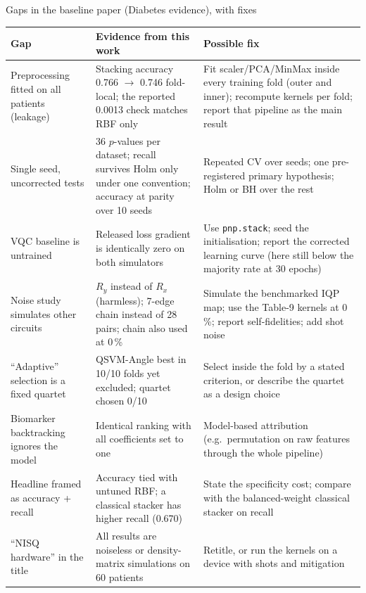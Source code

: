 \documentclass[aspectratio=169,10pt,t,xcolor={table}]{beamer}
\newcommand{\code}[1]{\texttt{\small #1}}
\begin{document}
\begin{frame}{Gaps in the baseline paper (Diabetes evidence), with fixes}
\scriptsize
\begin{tabular}{p{3.2cm}p{5.0cm}p{5.3cm}}
\toprule
Gap & Evidence from this work & Possible fix \\
\midrule
Preprocessing fitted on all patients (leakage) & Stacking accuracy 0.766 $\to$ 0.746 fold-local; the reported 0.0013 check matches RBF only & Fit scaler/PCA/MinMax inside every training fold (outer and inner); recompute kernels per fold; report that pipeline as the main result \\
Single seed, uncorrected tests & 36 $p$-values per dataset; recall survives Holm only under one convention; accuracy at parity over 10 seeds & Repeated CV over seeds; one pre-registered primary hypothesis; Holm or BH over the rest \\
VQC baseline is untrained & Released loss gradient is identically zero on both simulators & Use \code{pnp.stack}; seed the initialisation; report the corrected learning curve (here still below the majority rate at 30 epochs) \\
Noise study simulates other circuits & $R_y$ instead of $R_x$ (harmless); 7-edge chain instead of 28 pairs; chain also used at 0\,\% & Simulate the benchmarked IQP map; use the Table-9 kernels at 0\,\%; report self-fidelities; add shot noise \\
``Adaptive'' selection is a fixed quartet & QSVM-Angle best in 10/10 folds yet excluded; quartet chosen 0/10 & Select inside the fold by a stated criterion, or describe the quartet as a design choice \\
Biomarker backtracking ignores the model & Identical ranking with all coefficients set to one & Model-based attribution (e.g.\ permutation on raw features through the whole pipeline) \\
Headline framed as accuracy + recall & Accuracy tied with untuned RBF; a classical stacker has higher recall (0.670) & State the specificity cost; compare with the balanced-weight classical stacker on recall \\
``NISQ hardware'' in the title & All results are noiseless or density-matrix simulations on 60 patients & Retitle, or run the kernels on a device with shots and mitigation \\
\bottomrule
\end{tabular}
\end{frame}
\end{document}
